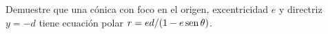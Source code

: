 \item Demuestre que una cónica con foco en el origen, excentricidad $e$ y directriz $y = -d$ tiene ecuación polar $r = ed / (1 - e \operatorname{sen}\theta)$.
